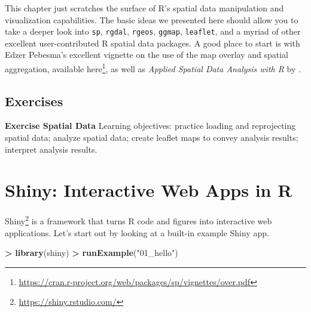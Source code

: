 \documentclass[]{krantz}
\makeatletter
\newenvironment{Shaded}{\begin{snugshade}}{\end{snugshade}}
\newcommand{\KeywordTok}[1]{\textcolor[rgb]{0.27,0.27,0.27}{\textbf{#1}}}
\newcommand{\StringTok}[1]{\textcolor[rgb]{0.5,0.5,0.5}{#1}}
\newcommand{\OperatorTok}[1]{\textcolor[rgb]{0.43,0.43,0.43}{\textbf{#1}}}
\newcommand{\NormalTok}[1]{#1}
\renewcommand{\href}[2]{#2\footnote{\url{#1}}}
\newenvironment{kframe}{%
\medskip{}
\setlength{\fboxsep}{.8em}
 \def\at@end@of@kframe{}%
 \ifinner\ifhmode%
  \def\at@end@of@kframe{\end{minipage}}%
  \begin{minipage}{\columnwidth}%
 \fi\fi%
 \def\FrameCommand##1{\hskip\@totalleftmargin \hskip-\fboxsep
 \colorbox{shadecolor}{##1}\hskip-\fboxsep
     \hskip-\linewidth \hskip-\@totalleftmargin \hskip\columnwidth}%
 \MakeFramed {\advance\hsize-\width
   \@totalleftmargin\z@ \linewidth\hsize
   \@setminipage}}%
 {\par\unskip\endMakeFramed%
 \at@end@of@kframe}
\renewenvironment{Shaded}{\begin{kframe}}{\end{kframe}}
\makeatother
\begin{document}
This chapter just scratches the surface of R's spatial data manipulation
and visualization capabilities. The basic ideas we presented here should
allow you to take a deeper look into \texttt{sp}, \texttt{rgdal},
\texttt{rgeos}, \texttt{ggmap}, \texttt{leaflet}, and a myriad of other
excellent user-contributed R spatial data packages. A good place to
start is with Edzer Pebesma's excellent vignette on the use of the map
overlay and spatial aggregation, available
\href{https://cran.r-project.org/web/packages/sp/vignettes/over.pdf}{here},
as well as \emph{Applied Spatial Data Analysis with R} by
\cite{Bivand13}.

\section{Exercises}\label{exercises-5}

\textbf{Exercise Spatial Data} Learning objectives: practice loading and
reprojecting spatial data; analyze spatial data; create leaflet maps to
convey analysis results; interpret analysis results.

\chapter{Shiny: Interactive Web Apps in
R}\label{shiny-interactive-web-apps-in-r}

\href{https://shiny.rstudio.com/}{Shiny} is a framework that turns R
code and figures into interactive web applications. Let's start out by
looking at a built-in example Shiny app.

\begin{Shaded}
\begin{Highlighting}[]
\OperatorTok{>}\StringTok{ }\KeywordTok{library}\NormalTok{(shiny)}
\OperatorTok{>}\StringTok{ }\KeywordTok{runExample}\NormalTok{(}\StringTok{"01_hello"}\NormalTok{)}
\end{Highlighting}
\end{Shaded}
\end{document}
